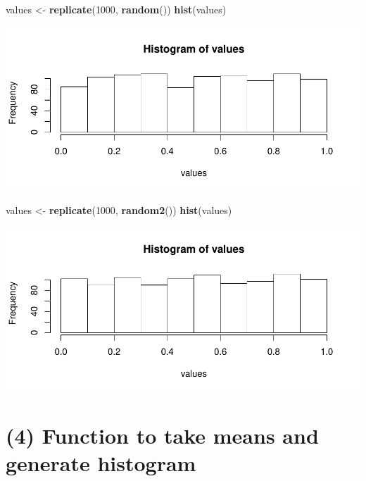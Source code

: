 \documentclass[]{article}
\newenvironment{Shaded}{\begin{snugshade}}{\end{snugshade}}
\newcommand{\KeywordTok}[1]{\textcolor[rgb]{0.13,0.29,0.53}{\textbf{{#1}}}}
\newcommand{\DecValTok}[1]{\textcolor[rgb]{0.00,0.00,0.81}{{#1}}}
\newcommand{\StringTok}[1]{\textcolor[rgb]{0.31,0.60,0.02}{{#1}}}
\newcommand{\NormalTok}[1]{{#1}}
\begin{document}
\begin{Shaded}
\begin{Highlighting}[]
\NormalTok{values <-}\StringTok{ }\KeywordTok{replicate}\NormalTok{(}\DecValTok{1000}\NormalTok{, }\KeywordTok{random}\NormalTok{())}
\KeywordTok{hist}\NormalTok{(values)}
\end{Highlighting}
\end{Shaded}

\includegraphics{CHunt_Assign9_PS1_files/figure-latex/unnamed-chunk-3-1.pdf}

\begin{Shaded}
\begin{Highlighting}[]
\NormalTok{values <-}\StringTok{ }\KeywordTok{replicate}\NormalTok{(}\DecValTok{1000}\NormalTok{, }\KeywordTok{random2}\NormalTok{())}
\KeywordTok{hist}\NormalTok{(values)}
\end{Highlighting}
\end{Shaded}

\includegraphics{CHunt_Assign9_PS1_files/figure-latex/unnamed-chunk-4-1.pdf}

\newpage

\section{(4) Function to take means and generate
histogram}\label{function-to-take-means-and-generate-histogram}
\end{document}
